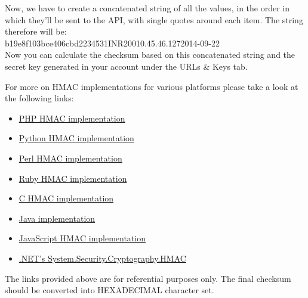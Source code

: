 \documentclass{article}
\begin{document}
Now, we have to create a concatenated string of all the values, in the order in which they'll be sent to the API, with single quotes around each item. The string therefore will be:
\\\textquotesingle{}b19e8f103bce406cbd\textquotesingle{}\textquotesingle{}223453\textquotesingle{}\textquotesingle{}1\textquotesingle{}\textquotesingle{}INR\textquotesingle{}\textquotesingle{}200\textquotesingle{}\textquotesingle{}10.45.46.127\textquotesingle{}\textquotesingle{}2014-09-22\textquotesingle{} \\ Now you can calculate the checksum based on this concatenated string and the secret key generated in
your account under the URLs \& Keys tab.

For more on HMAC implementations for various platforms please take a look at the following links:
 \begin{itemize}
\item \href{http://www.jokecamp.com/blog/examples-of-creating-base64-hashes-using-hmac-sha256-in-different-languages/#php}{PHP HMAC implementation}
\item \href{http://www.jokecamp.com/blog/examples-of-creating-base64-hashes-using-hmac-sha256-in-different-languages/#python}{Python HMAC implementation}
\item \href{http://www.jokecamp.com/blog/examples-of-creating-base64-hashes-using-hmac-sha256-in-different-languages/#perl}{Perl HMAC implementation}
\item \href{http://www.jokecamp.com/blog/examples-of-creating-base64-hashes-using-hmac-sha256-in-different-languages/#ruby3}{Ruby HMAC implementation}
\item \href{https://gist.github.com/tsupo/112188/acdbf002acf454bd60c355a776b9a5b58b6dff5e}{C HMAC implementation}
\item \href{http://www.jokecamp.com/blog/examples-of-creating-base64-hashes-using-hmac-sha256-in-different-languages/#java}{Java implementation}
\item \href{http://www.jokecamp.com/blog/examples-of-creating-base64-hashes-using-hmac-sha256-in-different-languages/#js}{JavaScript HMAC implementation}
\item \href{http://www.jokecamp.com/blog/examples-of-creating-base64-hashes-using-hmac-sha256-in-different-languages/#csharp}{.NET's System.Security.Cryptography.HMAC}
 \end{itemize}
The links provided above are for referential purposes only. The final checksum should be
converted into HEXADECIMAL character set.
\newpage
\end{document}
